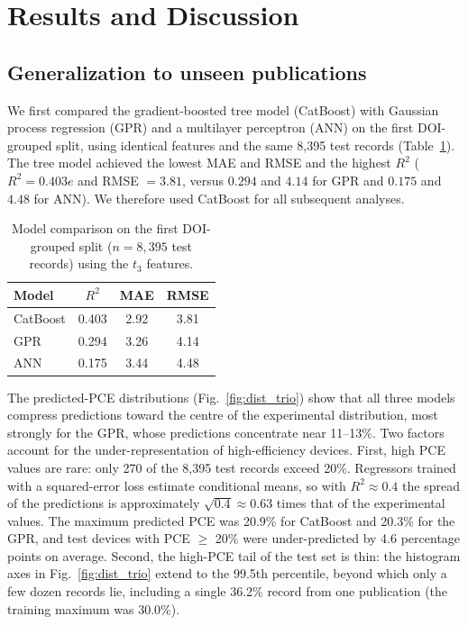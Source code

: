 \documentclass[3p]{elsarticle}
\begin{document}
\section{Results and Discussion}

\subsection{Generalization to unseen publications}

We first compared the gradient-boosted tree model (CatBoost) with Gaussian process regression (GPR) and a multilayer perceptron (ANN) on the first DOI-grouped split, using identical features and the same 8{,}395 test records (Table~\ref{tab:models}). The tree model achieved the lowest MAE and RMSE and the highest $R^2$ ($R^2 = 0.403e$ and RMSE $= 3.81$, versus $0.294$ and $4.14$ for GPR and $0.175$ and $4.48$ for ANN). We therefore used CatBoost for all subsequent analyses.

\begin{table}[t]
\centering\small
\caption{Model comparison on the first DOI-grouped split ($n = 8,395$ test records) using the $t_3$ features.}
\label{tab:models}
\begin{tabular}{lccc}
\toprule
Model & $R^2$ & MAE & RMSE \\
\midrule
CatBoost & 0.403 & 2.92 & 3.81 \\
GPR      & 0.294 & 3.26 & 4.14 \\
ANN      & 0.175 & 3.44 & 4.48 \\
\bottomrule
\end{tabular}
\end{table}

The predicted-PCE distributions (Fig.~\ref{fig:dist_trio}) show that all three models compress predictions toward the centre of the experimental distribution, most strongly for the GPR, whose predictions concentrate near 11--13\%. Two factors account for the under-representation of high-efficiency devices. First, high PCE values are rare: only 270 of the 8,395 test records exceed 20\%. Regressors trained with a squared-error loss estimate conditional means, so with $R^2 \approx 0.4$ the spread of the predictions is approximately $\sqrt{0.4}\approx 0.63$ times that of the experimental values. The maximum predicted PCE was 20.9\% for CatBoost and 20.3\% for the GPR, and test devices with PCE $\geq$ 20\% were under-predicted by 4.6 percentage points on average. Second, the high-PCE tail of the test set is thin: the histogram axes in Fig.~\ref{fig:dist_trio} extend to the 99.5th percentile, beyond which only a few dozen records lie, including a single 36.2\% record from one publication (the training maximum was 30.0\%).
\end{document}

